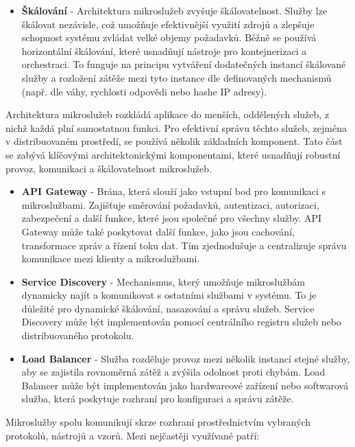 \begin{itemize}
    \item \textbf{Škálování} - Architektura mikroslužeb zvyšuje škálovatelnost. Služby lze škálovat nezávisle, což umožňuje efektivnější využití zdrojů a zlepšuje schopnost systému zvládat velké objemy požadavků. Běžně se používá horizontální škálování, které usnadňují nástroje pro kontejnerizaci a orchestraci. To funguje na principu vytváření dodatečných instancí škálované služby a rozložení zátěže mezi tyto instance dle definovaných mechanismů (např. dle váhy, rychlosti odpovědi nebo hashe IP adresy).
\end{itemize}


Architektura mikroslužeb rozkládá aplikace do menších, oddělených služeb, z nichž každá plní samostatnou funkci. Pro efektivní správu těchto služeb, zejména v distribuovaném prostředí, se používá několik základních komponent. Tato část se zabývá klíčovými architektonickými komponentami, které usnadňují robustní provoz, komunikaci a škálovatelnost mikroslužeb.


\begin{itemize}
    \item \textbf{API Gateway} - Brána, která slouží jako vstupní bod pro komunikaci s mikroslužbami. Zajišťuje směrování požadavků, autentizaci, autorizaci, zabezpečení a další funkce, které jsou společné pro všechny služby. API Gateway může také poskytovat další funkce, jako jsou cachování, transformace zpráv a řízení toku dat. Tím zjednodušuje a centralizuje správu komunikace mezi klienty a mikroslužbami.
    \item \textbf{Service Discovery} - Mechanismus, který umožňuje mikroslužbám dynamicky najít a komunikovat s ostatními službami v systému. To je důležité pro dynamické škálování, nasazování a správu služeb. Service Discovery může být implementován pomocí centrálního registru služeb nebo distribuovaného protokolu.
    \item \textbf{Load Balancer} - Služba rozděluje provoz mezi několik instancí stejné služby, aby se zajistila rovnoměrná zátěž a zvýšila odolnost proti chybám. Load Balancer může být implementován jako hardwareové zařízení nebo softwarová služba, která poskytuje rozhraní pro konfiguraci a správu zátěže.
\end{itemize}


Mikroslužby spolu komunikují skrze rozhraní prostřednictvím vybraných protokolů, nástrojů a vzorů. Mezi nejčastěji využívané patří:

